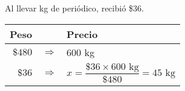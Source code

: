 Al llevar \fillin[45][1cm]kg de periódico, recibió \$36.

\begin{solutionbox}{3cm}
    \begin{tabular}{r>{\centering}p{0.2cm}l}
        \textbf{Peso} & & \textbf{Precio}\\
        \hline 
     $\$480$ & $\Rightarrow$ &  $600$ kg                                                  \\
     $\$36$ & $\Rightarrow$ & $x=\dfrac{\$36  \times 600 \text{ kg}}{\$480}=45 \text{ kg}$  \\
    \end{tabular}
    \end{solutionbox}